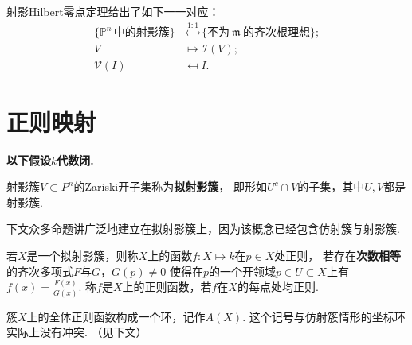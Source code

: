     
    \begin{corollary}射影Hilbert零点定理给出了如下一一对应：
        \begin{equation*}\begin{aligned}
          \{\mathbb{P}^{n}\,中的射影簇\} &\overset{1:1}{\longleftrightarrow} 
          \{不为\ \mathfrak{m}\ 的齐次根理想\}; \\
          V &\longmapsto \mathcal{I}(V); \\
          \mathcal{V}(I) &\mapsfrom I.
        \end{aligned}\end{equation*}
    \end{corollary}


\section{正则映射}
    \textbf{以下假设$k$代数闭.}
    \begin{definition}
      射影簇$V \subset P^{n}$的Zariski开子集称为\textbf{拟射影簇}，
      即形如$U^{c} \cap V$的子集，其中$U,V$都是射影簇.
    \end{definition}
    
    下文众多命题讲广泛地建立在拟射影簇上，因为该概念已经包含仿射簇与射影簇. 

    \begin{definition}
        若$X$是一个拟射影簇，则称$X$上的函数$f\colon X \mapsto k$在$p \in X$处正则，
        若存在\textbf{次数相等}的齐次多项式$F$与$G$，$G(p) \neq 0$
        使得在$p$的一个开领域$p \in U \subset X$上有$f(x)=\frac{F(x)}{G(x)}$.
        称$f$是$X$上的正则函数，若$f$在$X$的每点处均正则.
    \end{definition}

    \begin{definition}
        簇$X$上的全体正则函数构成一个环，记作$A(X)$. 
        这个记号与仿射簇情形的坐标环实际上没有冲突. （见下文）
    \end{definition}

